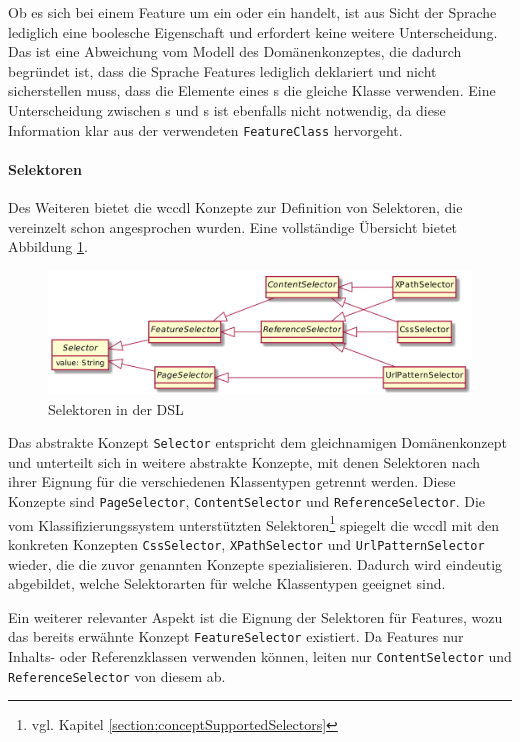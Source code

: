     Ob es sich bei einem Feature um ein {\scalarFeature} oder ein {\collectionFeature} handelt,
    ist aus Sicht der Sprache lediglich eine boolesche Eigenschaft und erfordert
    keine weitere Unterscheidung.
    Das ist eine Abweichung vom Modell des Domänenkonzeptes, die dadurch begründet ist,
    dass die Sprache Features lediglich deklariert und nicht sicherstellen muss,
    dass die Elemente eines {\collectionFeature}s die gleiche Klasse verwenden.
    Eine Unterscheidung zwischen {\contentFeature}s und {}s
    ist ebenfalls nicht notwendig,
    da diese Information klar aus der verwendeten \texttt{FeatureClass} hervorgeht.

    \paragraph{Selektoren}
    Des Weiteren bietet die \gls{wccdl} Konzepte zur Definition von Selektoren,
    die vereinzelt schon angesprochen wurden.
    Eine vollständige Übersicht bietet Abbildung \ref{image:dslSelectors}.

    \begin{figure}[htb]
        \centering
        \includegraphics[scale=\imageScalingFactor]{../resources/dsl/selectors.png}
        \caption{Selektoren in der DSL}
        \label{image:dslSelectors}
    \end{figure}

    Das abstrakte Konzept \texttt{Selector} entspricht dem gleichnamigen Domänenkonzept
    und unterteilt sich in weitere abstrakte Konzepte,
    mit denen Selektoren nach ihrer Eignung für die verschiedenen Klassentypen getrennt werden.
    Diese Konzepte sind \texttt{PageSelector}, \texttt{ContentSelector} und \texttt{ReferenceSelector}.
    Die vom Klassifizierungssystem unterstützten
    Selektoren\footnote{vgl. Kapitel \ref{section:conceptSupportedSelectors}}
    spiegelt die \gls{wccdl} mit den konkreten Konzepten
    \texttt{CssSelector}, \texttt{XPathSelector} und \texttt{UrlPatternSelector} wieder,
    die die zuvor genannten Konzepte spezialisieren.
    Dadurch wird eindeutig abgebildet, welche Selektorarten für welche Klassentypen geeignet sind.

    Ein weiterer relevanter Aspekt ist die Eignung der Selektoren für Features,
    wozu das bereits erwähnte Konzept \texttt{FeatureSelector} existiert.
    Da Features nur Inhalts- oder Referenzklassen verwenden können,
    leiten nur \texttt{ContentSelector} und \texttt{ReferenceSelector} von diesem ab.
    